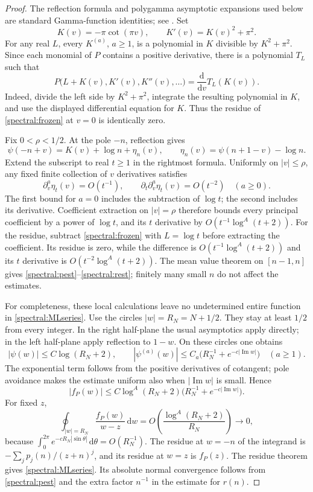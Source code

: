 \documentclass[11pt,a4paper]{article}
\numberwithin{equation}{section}
\theoremstyle{definition}
\theoremstyle{remark}
\newcommand{\im}{\operatorname{Im}}
\newcommand{\dd}{\,\mathrm d}
\begin{document}
\begin{proof}
The reflection formula and polygamma asymptotic expansions used below
are standard Gamma-function identities; see \cite[\S\S5.11,5.15]{DLMF}.
Set
\[
 K(v)=-\pi\cot(\pi v),\qquad K'(v)=K(v)^2+\pi^2.
\]
For any real $L$, every $K^{(a)}$, $a\geq1$, is a polynomial in $K$
divisible by $K^2+\pi^2$.  Since each monomial of $P$ contains a positive
derivative, there is a polynomial $T_L$ such that
\begin{equation}\label{spectral:frozen}
 P\bigl(L+K(v),K'(v),K''(v),\ldots\bigr)
       =\frac{\mathrm d}{\mathrm dv}T_L(K(v)).
\end{equation}
Indeed, divide the left side by $K^2+\pi^2$, integrate the resulting
polynomial in $K$, and use the displayed differential equation for $K$.
Thus the residue of \eqref{spectral:frozen} at $v=0$ is identically zero.

Fix $0<\rho<1/2$.  At the pole $-n$, reflection gives
\[
 \psi(-n+v)=K(v)+\log n+\eta_n(v),\qquad
 \eta_n(v)=\psi(n+1-v)-\log n.
\]
Extend the subscript to real $t\geq1$ in the rightmost formula.  Uniformly
on $|v|\leq\rho$, any fixed finite collection of $v$ derivatives satisfies
\[
 \partial_v^a\eta_t(v)=O(t^{-1}),\qquad
 \partial_t\partial_v^a\eta_t(v)=O(t^{-2})\quad(a\geq0).
\]
The first bound for $a=0$ includes the subtraction of $\log t$; the
second includes its derivative.  Coefficient extraction on $|v|=\rho$
therefore bounds every principal coefficient by a power of $\log t$,
and its $t$ derivative by $O(t^{-1}\log^A(t+2))$.  For the residue,
subtract \eqref{spectral:frozen} with $L=\log t$ before extracting the
coefficient.  Its residue is zero, while the difference is
$O(t^{-1}\log^A(t+2))$ and its $t$ derivative is
$O(t^{-2}\log^A(t+2))$.  The mean value theorem on $[n-1,n]$ gives
\eqref{spectral:pest}--\eqref{spectral:rest}; finitely many small $n$
do not affect the estimates.

For completeness, these local calculations leave no undetermined entire
function in \eqref{spectral:MLseries}.  Use the circles
$|w|=R_N=N+1/2$.  They stay at least $1/2$ from every integer.  In the
right half-plane the usual asymptotics apply directly; in the left
half-plane apply reflection to $1-w$.  On these circles one obtains
\[
 |\psi(w)|\leq C\log(R_N+2),\qquad
 |\psi^{(a)}(w)|\leq C_a
       \bigl(R_N^{-1}+e^{-c|\im w|}\bigr)\quad(a\geq1).
\]
The exponential term follows from the positive derivatives of cotangent;
pole avoidance makes the estimate uniform also when $|\im w|$ is small.
Hence
\[
 |f_P(w)|\leq C\log^A(R_N+2)
                  \bigl(R_N^{-1}+e^{-c|\im w|}\bigr).
\]
For fixed $z$,
\[
 \oint_{|w|=R_N}\frac{f_P(w)}{w-z}\dd w
     =O\!\left(\frac{\log^A(R_N+2)}{R_N}\right)\longrightarrow0,
\]
because $\int_0^{2\pi}e^{-cR_N|\sin\theta|}\dd\theta=O(R_N^{-1})$.
The residue at $w=-n$ of the integrand is
$-\sum_jp_j(n)/(z+n)^j$, and its residue at $w=z$ is $f_P(z)$.
The residue theorem gives \eqref{spectral:MLseries}.  Its absolute normal
convergence follows from \eqref{spectral:pest} and the extra factor
$n^{-1}$ in the estimate for $r(n)$.


\end{proof}
\end{document}
